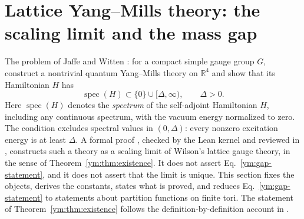 \section{Lattice Yang--Mills theory: the scaling limit and the mass gap}\label{ym:sec:lattice}
The problem of Jaffe and Witten \cite{JaffeWitten2006}: for a compact simple
gauge group $G$, construct a nontrivial quantum Yang--Mills theory on
$\mathbb R^4$ and show that its Hamiltonian $H$ has
\begin{equation}\label{ym:gap-statement}
 \operatorname{spec}(H)\subset\{0\}\cup[\Delta,\infty),\qquad\Delta>0 .
\end{equation}
Here $\operatorname{spec}(H)$ denotes the \emph{spectrum} of the self-adjoint
Hamiltonian $H$, including any continuous spectrum, with the vacuum energy
normalized to zero. The condition excludes spectral values in $(0,\Delta)$:
every nonzero excitation energy is at least $\Delta$.
A formal proof \cite{OpenAIYM2026}, checked by the Lean kernel and reviewed in
\cite{YMGroup2026}, constructs such a theory as a scaling limit of Wilson's
lattice gauge theory, in the sense of Theorem~\ref{ym:thm:existence}. It does
not assert Eq.~\eqref{ym:gap-statement}, and it does not assert that the limit
is unique. This section fixes the objects, derives the constants, states what
is proved, and reduces Eq.~\eqref{ym:gap-statement} to statements about
partition functions on finite tori. The statement of
Theorem~\ref{ym:thm:existence} follows the definition-by-definition account in
\cite{Armstrong2026}.

